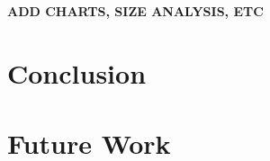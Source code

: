 
\textbf{ADD CHARTS, SIZE ANALYSIS, ETC}

\chapter{Conclusion}
\label{cpt:conclusion}

\chapter{Future Work}
\label{cpt:future}